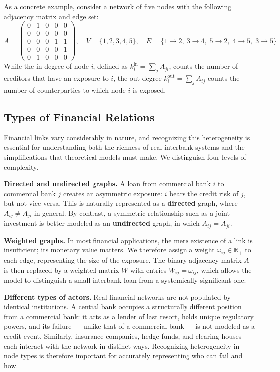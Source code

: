 \documentclass[a4paper,12pt,twoside]{article}
\begin{document}
As a concrete example, consider a network of five nodes with the 
following adjacency matrix and edge set:
\[
A =
\begin{pmatrix}
0 & 1 & 0 & 0 & 0 \\
0 & 0 & 0 & 0 & 0 \\
0 & 0 & 0 & 1 & 1 \\
0 & 0 & 0 & 0 & 1 \\
0 & 1 & 0 & 0 & 0
\end{pmatrix}, 
\quad
V = \{1,2,3,4,5\}, 
\quad
E = \{1 \to 2,\; 3 \to 4,\; 5 \to 2,\; 4 \to 5,\; 3 \to 5\}
\]
While the in-degree of node 
    $i$, defined as $k_i^{\text{in}} = \sum_j A_{ji}$, counts the number 
    of creditors that have an exposure to $i$, the out-degree $k_i^{\text{out}} = \sum_j A_{ij}$ counts 
    the number of counterparties to which node $i$ is exposed.
\subsection{Types of Financial Relations}
\label{sec:types_relations}

Financial links vary considerably in nature, and recognizing this 
heterogeneity is essential for understanding both the richness of real 
interbank systems and the simplifications that theoretical models must 
make. We distinguish four levels of complexity.

\textbf{Directed and undirected graphs.} A loan from commercial bank 
$i$ to commercial bank $j$ creates an asymmetric exposure: $i$ bears 
the credit risk of $j$, but not vice versa. This is naturally 
represented as a \textbf{directed} graph, where $A_{ij} \neq A_{ji}$ 
in general. By contrast, a symmetric relationship such as a joint 
investment is better modeled as an \textbf{undirected} graph, in which 
$A_{ij} = A_{ji}$.

\textbf{Weighted graphs.} In most financial applications, the mere 
existence of a link is insufficient; its monetary value matters. We 
therefore assign a weight $\omega_{ij} \in \mathbb{R}_{+}$ to each 
edge, representing the size of the exposure. The binary adjacency 
matrix $A$ is then replaced by a weighted matrix $W$ with entries 
$W_{ij} = \omega_{ij}$, which allows the model to distinguish a 
small interbank loan from a systemically significant one.

\textbf{Different types of actors.} Real financial networks are not 
populated by identical institutions. A central bank occupies a 
structurally different position from a commercial bank: it acts as a 
lender of last resort, holds unique regulatory powers, and its failure 
— unlike that of a commercial bank — is not modeled as a credit event. 
Similarly, insurance companies, hedge funds, and clearing houses each 
interact with the network in distinct ways. Recognizing heterogeneity 
in node types is therefore important for accurately representing who 
can fail and how.
\end{document}
